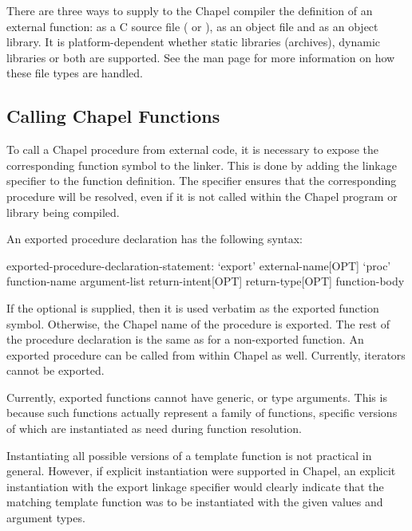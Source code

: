 There are three ways to supply to the Chapel compiler the definition of an
external function: as a C source file ( or ), as an object
file and as an object library.  It is platform-dependent whether static
libraries (archives), dynamic libraries or both are supported.  See
the  man page for more information on how these file types are handled.

\subsection{Calling Chapel Functions}
\label{Calling_Chapel_Functions}

To call a Chapel procedure from external code, it is necessary to expose the
corresponding function symbol to the linker.  This is done by adding
the  linkage specifier to the function definition.
The  specifier ensures that the corresponding procedure will be
resolved, even if it is not called within the Chapel program or library being
compiled.

An exported procedure declaration has the following syntax:
\begin{syntax}
exported-procedure-declaration-statement:
  `export' external-name[OPT] `proc' function-name argument-list return-intent[OPT] return-type[OPT]
    function-body
\end{syntax}

If the optional  is
supplied, then it is used verbatim as the exported function symbol.  Otherwise,
the Chapel name of the procedure is exported.  The rest of the procedure
declaration is the same as for a non-exported function.  An exported procedure can be
called from within Chapel as well.  Currently, iterators cannot be exported.

\begin{future}
Currently, exported functions cannot have generic,  or type arguments.
This is because such functions actually represent a family of functions,
specific versions of which are instantiated as need during function resolution.

Instantiating all possible versions of a template function is not
practical in general.  However, if explicit instantiation were supported in
Chapel, an explicit instantiation with the export linkage specifier would
clearly indicate that the matching template function was to be instantiated with
the given  values and argument types.
\end{future}

